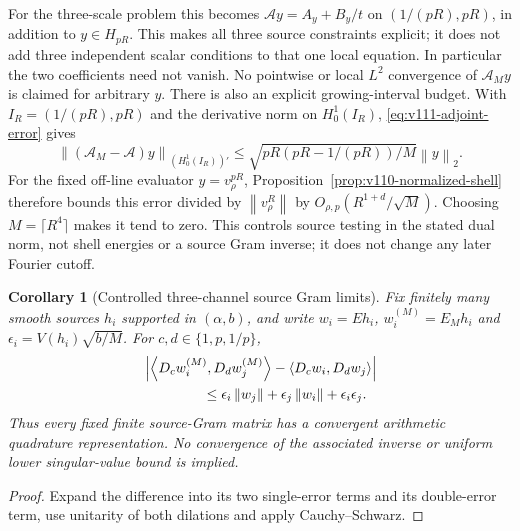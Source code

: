 \documentclass[11pt]{article}
\newtheorem{corollary}[theorem]{Corollary}
\theoremstyle{remark}
\newcommand{\norm}[1]{\left\lVert #1\right\rVert}
\newcommand{\ip}[2]{\left\langle #1,#2\right\rangle}
\begin{document}
For the three-scale problem this becomes
$\mathscr Ay=A_y+B_y/t$ on $(1/(pR),pR)$, in addition to
$y\in H_{pR}$. This makes all three source constraints explicit;
it does not add three independent scalar conditions to that one local
equation. In particular the two coefficients need not vanish.
No pointwise or local $L^2$ convergence of $\mathscr A_My$ is claimed
for arbitrary $y$.
There is also an explicit growing-interval budget. With
$I_R=(1/(pR),pR)$ and the derivative norm on $H_0^1(I_R)$,
\eqref{eq:v111-adjoint-error} gives
\[
 \norm{(\mathscr A_M-\mathscr A)y}_{(H_0^1(I_R))'}
 \le\sqrt{pR(pR-1/(pR))/M}\norm y_2.
\]
For the fixed off-line evaluator $y=v_\rho^{pR}$,
Proposition~\ref{prop:v110-normalized-shell} therefore bounds this error
divided by $\norm{v_\rho^R}$ by $O_{\rho,p}(R^{1+d}/\sqrt M)$.
Choosing $M=\lceil R^4\rceil$ makes it tend to zero. This controls
source testing in the stated dual norm, not shell energies or a source
Gram inverse; it does not change any later Fourier cutoff.

\begin{corollary}[Controlled three-channel source Gram limits]\label{cor:v111-gram}
Fix finitely many smooth sources $h_i$ supported in $(\alpha,b)$, and
write $w_i=Eh_i$, $w_i^{(M)}=E_Mh_i$ and
$\epsilon_i=V(h_i)\sqrt{b/M}$. For
$c,d\in\{1,p,1/p\}$,
\begin{align*}
 &\left|\ip{D_cw_i^{(M)}}{D_dw_j^{(M)}}-
                  \ip{D_cw_i}{D_dw_j}\right|\\
 &\hspace{15mm}\le
 \epsilon_i\norm{w_j}+\epsilon_j\norm{w_i}+\epsilon_i\epsilon_j.
\end{align*}
Thus every fixed finite source-Gram matrix has a convergent arithmetic
quadrature representation. No convergence of the associated inverse or
uniform lower singular-value bound is implied.
\end{corollary}
\begin{proof}
Expand the difference into its two single-error terms and its double-error
term, use unitarity of both dilations and apply Cauchy--Schwarz.
\end{proof}
\end{document}

